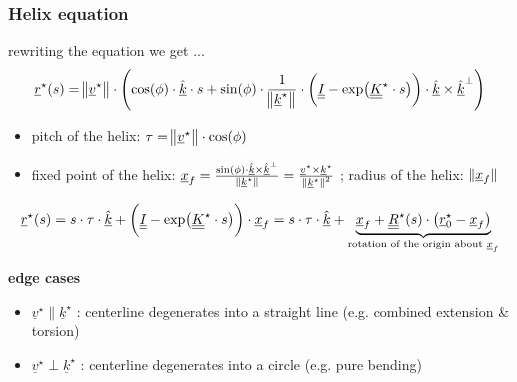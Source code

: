 \begin{frame}
  \frametitle{Helix equation}

  rewriting the equation we get ...  %
  \begin{displaymath}
    \underline{r}^{\star}(s) = \norm[1]{\underline{v}^{\star}} \cdot \Biggl( \cos(\phi) \cdot \underline{\hat{k}} \cdot s + \sin(\phi) \cdot \frac{1}{\norm[1]{\underline{k}^{\star}}} \cdot \biggl( \underline{\underline{I}} - \exp \bigl( \underline{\underline{K}}^{\star} \cdot s \bigr) \biggr) \cdot \underline{\hat{k}} \times \underline{\hat{k}}^{\perp} \Biggr)
  \end{displaymath}
  
  \begin{itemize}
    \item pitch of the helix: $\tau = \norm[1]{\underline{v}^{\star}} \cdot \cos(\phi)$
    \item fixed point of the helix: $\underline{x}_f = \frac{\sin(\phi) \cdot \underline{\hat{k}} \times \underline{\hat{k}}^{\perp}}{\norm[0]{\underline{k}^{\star}}} = \frac{\underline{v}^{\star} \times \underline{k}^{\star}}{\norm[0]{\underline{k}^{\star}}^2}$ ; radius of the helix: $\norm[0]{\underline{x}_f}$
  \end{itemize}
  
  \begin{displaymath}
    \underline{r}^{\star}(s) = s \cdot \tau \cdot \underline{\hat{k}} + \biggl( \underline{\underline{I}} - \exp \bigl( \underline{\underline{K}}^{\star} \cdot s \bigr) \biggr) \cdot \underline{x}_f =
    s \cdot \tau \cdot \underline{\hat{k}} + \underbrace{ \underline{x}_f + \underline{\underline{R}}^{\star}(s) \cdot \bigl( \underline{r}^{\star}_0 - \underline{x}_f \bigr) }_{\text{rotation of the origin about }\underline{x}_f}
  \end{displaymath}
  
  \vspace{0.5em}
  \textbf{edge cases}
  \begin{itemize}
    \item $\underline{v}^{\star} \parallel \underline{k}^{\star}$ : 
      centerline degenerates into a straight line (e.g. combined extension \& torsion)
    \item $\underline{v}^{\star} \perp \underline{k}^{\star}$ : 
      centerline degenerates into a circle (e.g. pure bending)
  \end{itemize}
\end{frame}


